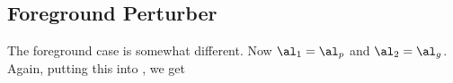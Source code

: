 \subsection{Foreground Perturber}\label{subsec:foreground}
The foreground case is somewhat different. Now $\al_1 = \al_p$ and $\al_2 = \al_g$. Again, putting this into , we get